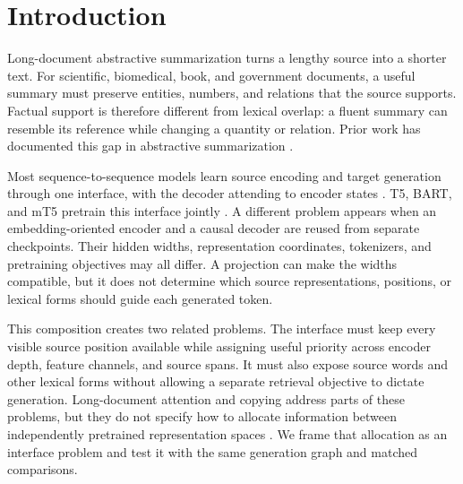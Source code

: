 
\section{Introduction}
\label{sec:introduction}

Long-document abstractive summarization turns a lengthy source into a shorter text. For scientific, biomedical, book, and government documents, a useful summary must preserve entities, numbers, and relations that the source supports. Factual support is therefore different from lexical overlap: a fluent summary can resemble its reference while changing a quantity or relation. Prior work has documented this gap in abstractive summarization \citep{maynez2020faithfulness}.

Most sequence-to-sequence models learn source encoding and target generation through one interface, with the decoder attending to encoder states \citep{sutskever2014sequence,bahdanau2015neural,vaswani2017attention}. T5, BART, and mT5 pretrain this interface jointly \citep{raffel2020t5,lewis2020bart,xue2021mt5}. A different problem appears when an embedding-oriented encoder and a causal decoder are reused from separate checkpoints. Their hidden widths, representation coordinates, tokenizers, and pretraining objectives may all differ. A projection can make the widths compatible, but it does not determine which source representations, positions, or lexical forms should guide each generated token.

This composition creates two related problems. The interface must keep every visible source position available while assigning useful priority across encoder depth, feature channels, and source spans. It must also expose source words and other lexical forms without allowing a separate retrieval objective to dictate generation. Long-document attention and copying address parts of these problems, but they do not specify how to allocate information between independently pretrained representation spaces \citep{cohan2018discourse,see2017get}. We frame that allocation as an interface problem and test it with the same generation graph and matched comparisons.

